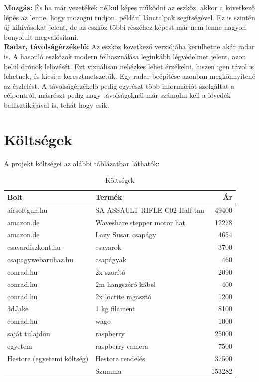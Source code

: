 \documentclass[12pt,a4paper]{article}
\begin{document}
\textbf{Mozgás:} És ha már vezetékek nélkül képes működni az eszköz, akkor a következő lépés az lenne, hogy mozogni tudjon, például lánctalpak segítségével. Ez is szintén új kihívásokat jelent, de az eszköz többi részéhez képest már nem lenne nagyon bonyolult megvalósítani.\\

\textbf{Radar, távolságérzékelő:} Az eszköz következő verziójába kerülhetne akár radar is. A hasonló eszközök modern felhasználása leginkább légvédelmet jelent, azon belül drónok lelövését. Ezt vizuálisan nehézkes lehet érzékelni, hiszen igen távol is lehetnek, és kicsi a keresztmetszetük. Egy radar beépítése azonban megkönnyítené az észlelést. A távolságérzékelő pedig egyrészt több információt szolgáltat a célpontról, másrészt pedig nagy távolságoknál már számolni kell a lövedék ballisztikájával is, tehát hogy esik.

\pagebreak

\section{Költségek}
A projekt költségei az alábbi táblázatban láthatók:
\begin{table}[h!]
	\centering
	\begin{tabular}{|l|l|r|}
		\hline
		\textbf{Bolt}              & \textbf{Termék}               & \textbf{Ár} \\ \hline
		airsoftgun.hu              & SA ASSAULT RIFLE C02 Half-tan & 49400       \\ \hline
		amazon.de                  & Waveshare stepper motor hat   & 12278       \\ \hline
		amazon.de                  & Lazy Susan csapágy            & 4654        \\ \hline
		csavardiszkont.hu          & csavarok                      & 3700        \\ \hline
		csapagywebaruhaz.hu        & csapágyak                     & 460         \\ \hline
		conrad.hu                  & 2x szorító                    & 2090        \\ \hline
		conrad.hu                  & 2m hangszóró kábel            & 400         \\ \hline
		conrad.hu                  & 2x loctite ragasztó           & 1200        \\ \hline
		3dJake                     & 1 kg filament                 & 8100        \\ \hline
		conrad.hu                  & wago                          & 1000        \\ \hline
		saját tulajdon             & raspberry                     & 25000       \\ \hline
		egyetem                    & raspberry camera              & 7500        \\ \hline
		Hestore (egyetemi költség) & Hestore rendelés              & 37500       \\ \hline
		& Szumma                        & 153282      \\ \hline
	\end{tabular}
	\caption{Költségek}
	\label{tab:koltsegek}
\end{table}
\pagebreak
\end{document}
